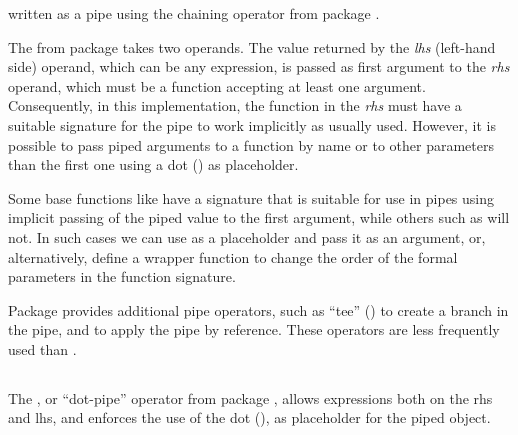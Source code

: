 \documentclass[krantz2]{krantz}\usepackage{knitr}
\begin{document}
written as a pipe using the chaining operator from package .

\begin{knitrout}\footnotesize
{}\color{fgcolor}
\end{knitrout}

\begin{explainbox}
The \Roperator{\%>\%} from package  takes two operands. The value returned by the \emph{lhs} (left-hand side) operand, which can be any \Rlang expression, is passed as first argument to the \emph{rhs} operand, which must be a function accepting at least one argument. Consequently, in this implementation, the function in the \emph{rhs} must have a suitable signature for the pipe to work implicitly as usually used. However, it is possible to pass piped arguments to a function by name or to other parameters than the first one using a dot () as placeholder.

Some base \Rlang functions like  have a signature that is suitable for use in  pipes using implicit passing of the piped value to the first argument, while others such as  will not. In such cases we can use  as a placeholder and pass it as an argument, or, alternatively, define a wrapper function to change the order of the formal parameters in the function signature.
\end{explainbox}

Package  provides additional pipe operators, such as ``tee'' () to create a branch in the pipe, and \Roperator{\%<>\%} to apply the pipe by reference. These operators are less frequently used than \Roperator{\%>\%}.

\subsection{}
The , or ``dot-pipe'' operator from package , allows expressions both on the rhs and lhs, and enforces the use of the dot (), as placeholder for the piped object.
\end{document}
